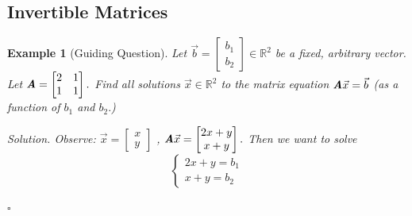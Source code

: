 \documentclass[12pt, a4paper]{article}
\newtheorem{eg}{Example}[subsection]
\newenvironment*{sol}{\indent\textit{Solution. }}{\hfill{$\square$}\par}
\def\R{{\mathbb{R}}}
\def\vecx{\vec{x}}
\def\vecb{\vec{b}}
\def\matrixA{\textbf{\emph{A}}}
\begin{document}
\subsection{Invertible Matrices}
\begin{eg}[Guiding Question]
	Let $\vecb=\begin{bmatrix}b_1\\b_2\end{bmatrix}\in\R^2$ be a fixed, arbitrary vector. Let $\matrixA=\begin{bmatrix}2&1\\1&1\end{bmatrix}.$ Find all solutions $\vecx\in\R^2$ to the matrix equation $\matrixA\vecx=\vecb$ (as a function of $b_1$ and $b_2.$)
	
	\begin{sol}
		Observe: $\vecx=\begin{bmatrix}x\\y\end{bmatrix}$	, $\matrixA\vecx=\begin{bmatrix}2x+y\\x+y\end{bmatrix}.$ Then we want to solve \[\begin{cases}2x+y=b_1\\x+y=b_2\end{cases}\]

\end{sol}
\end{eg}
\end{document}
